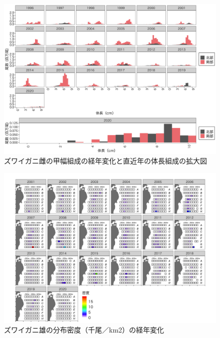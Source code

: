 \documentclass[11pt]{article} %
\begin{document}
\begin{linenumbers}
\begin{figure}[h]
  \centering
  \includegraphics[width = 14cm]{ズワイガニ雌length.png}
  \caption{ズワイガニ雌の甲幅組成の経年変化と直近年の体長組成の拡大図}
\end{figure}

\begin{figure}[h]
  \centering
  \includegraphics[width = 14cm]{ズワイガニ雄dens.png}
  \caption{ズワイガニ雄の分布密度（千尾／km2）の経年変化}
\end{figure}


\end{linenumbers}
\end{document}
